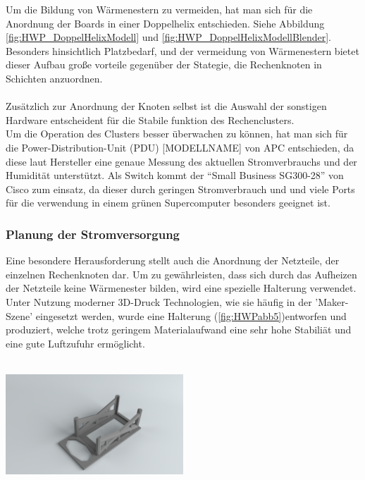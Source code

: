 Um die Bildung von Wärmenestern zu vermeiden, hat man sich für die
Anordnung der Boards in einer Doppelhelix entschieden. Siehe Abbildung \ref{fig:HWP_DoppelHelixModell} und \ref{fig:HWP_DoppelHelixModellBlender}.
Besonders hinsichtlich Platzbedarf, und der vermeidung von Wärmenestern 
bietet dieser Aufbau große vorteile gegenüber der Stategie, die 
Rechenknoten in Schichten anzuordnen.
~\\~\\
Zusätzlich zur Anordnung der Knoten selbst ist die Auswahl der
sonstigen Hardware entscheident für die Stabile funktion des
Rechenclusters.\\
Um die Operation des Clusters besser überwachen zu können, hat man sich
für die Power-Distribution-Unit (PDU) [MODELLNAME] von APC entschieden, da
diese laut Hersteller eine genaue Messung des aktuellen Stromverbrauchs und
der Humidität unterstützt. Als Switch kommt der ``Small Business SG300-28''
von Cisco zum einsatz, da dieser durch geringen Stromverbrauch und
und viele Ports für die verwendung in einem grünen Supercomputer 
besonders geeignet ist.

\subsubsection{Planung der Stromversorgung}
Eine besondere Herausforderung stellt auch die 
Anordnung der Netzteile, der einzelnen Rechenknoten dar.
Um zu gewährleisten, dass sich durch das Aufheizen der Netzteile keine
Wärmenester bilden, wird eine spezielle Halterung verwendet.
Unter Nutzung moderner 3D-Druck Technologien, wie sie häufig in der 'Maker-Szene' eingesetzt werden,
wurde eine Halterung (\ref{fig:HWPabb5})entworfen und produziert, welche trotz geringem Materialaufwand eine sehr hohe Stabiliät 
und eine gute Luftzufuhr ermöglicht.~\\~\\
\begin{minipage}{\textwidth}
\begin{center}
	\includegraphics[width=0.5\textwidth]{./Bilder/Server-Aufbau/RenderPowerSupplyBox30.png}
	\label{fig:HWPabb5}

\end{center}	
\end{minipage}
~\\

